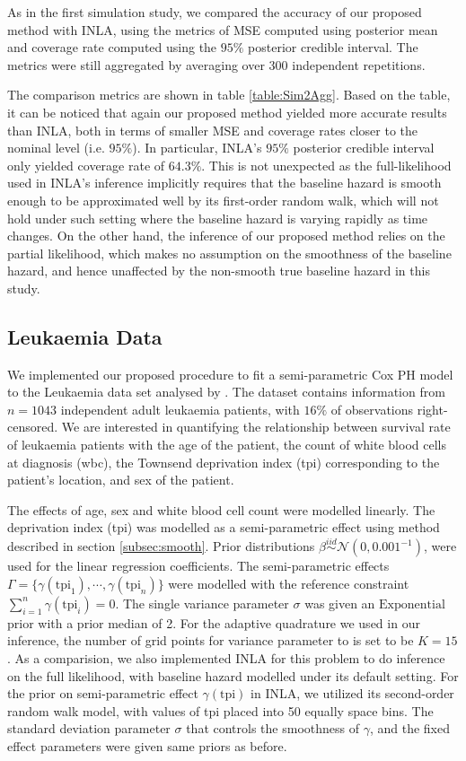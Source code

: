 \documentclass[ba]{imsart}
\begin{document}
As in the first simulation study, we compared the accuracy of our proposed method with INLA, using the metrics of MSE computed using posterior mean and coverage rate computed using the $95\%$ posterior credible interval. The metrics were still aggregated by averaging over 300 independent repetitions.

The comparison metrics are shown in table \ref{table:Sim2Agg}. Based on the table, it can be noticed that again our proposed method yielded more accurate results than INLA, both in terms of smaller MSE and coverage rates closer to the nominal level (i.e. $95\%$). In particular, INLA's $95\%$ posterior credible interval only yielded coverage rate of $64.3\%$. This is not unexpected as the full-likelihood used in INLA's inference implicitly requires that the baseline hazard is smooth enough to be approximated well by its first-order random walk, which will not hold under such setting where the baseline hazard is varying rapidly as time changes. On the other hand, the inference of our proposed method relies on the partial likelihood, which makes no assumption on the smoothness of the baseline hazard, and hence unaffected by the non-smooth true baseline hazard in this study.

\subsection{Leukaemia Data}\label{subsec:leuk}

We implemented our proposed procedure to fit a semi-parametric Cox PH model to the Leukaemia data set analysed by \cite{inlacoxph}. The dataset contains information from $n=1043$ independent adult leukaemia patients, with $16\%$ of observations right-censored. We are interested in quantifying the relationship between survival rate of leukaemia patients with the age of the patient, the count of white blood cells at diagnosis (wbc), the Townsend deprivation index (tpi) corresponding to the patient's location, and sex of the patient.

The effects of age, sex and white blood cell count were modelled linearly. The deprivation index (tpi) was modelled as a semi-parametric effect using method described in section \ref{subsec:smooth}. Prior distributions $\beta \stackrel{iid}{\sim} \mathcal{N}(0, 0.001^{-1})$, were used for the linear regression coefficients. The semi-parametric effects $\Gamma = \{\gamma(\text{tpi}_1), \cdots, \gamma(\text{tpi}_n)\}$ were modelled with the reference constraint $\sum_{i=1}^{n}\gamma(\text{tpi}_i) = 0$. The single variance parameter $\sigma$ was given an $\text{Exponential}$ prior with a prior median of 2. For the adaptive quadrature we used in our inference, the number of grid points for variance parameter to is set to be $K = 15$. As a comparision, we also implemented INLA for this problem to do inference on the full likelihood, with baseline hazard modelled under its default setting. For the prior on semi-parametric effect $\gamma(\text{tpi})$ in INLA, we utilized its second-order random walk model, with values of tpi placed into 50 equally space bins. The standard deviation parameter $\sigma$ that controls the smoothness of $\gamma$, and the fixed effect parameters were given same priors as before.
\end{document}
